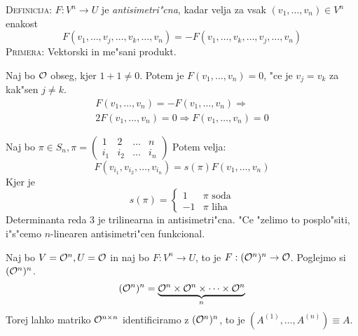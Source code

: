 %
\textsc{Definicija:} $F: V^n \to U$ je \emph{antisimetri"cna}, kadar velja za vsak $(v_1, \ldots, v_n) \in V^n$ enakost
\begin{equation*}
F(v_1, \ldots, v_j, \ldots, v_k, \ldots, v_n) = - F(v_1, \ldots, v_k, \ldots, v_j, \ldots, v_n)
\end{equation*}
\textsc{Primera:} Vektorski in me"sani produkt.

Naj bo $\mathcal{O}$ obseg, kjer $1 + 1 \neq 0$. Potem je $F(v_1, \ldots, v_n) = 0$, "ce je $v_j = v_k$ za kak"sen $j \neq k$.
\begin{gather*}
F(v_1, \ldots, v_n) = - F(v_1, \ldots, v_n) \Rightarrow \\
2F(v_1, \ldots, v_n) = 0 \Rightarrow F(v_1, \ldots, v_n) = 0
\end{gather*}

Naj bo $\pi \in S_n, \pi = \begin{pmatrix}
1 & 2 & \ldots & n \\
i_1 & i_2 & \ldots & i_n
\end{pmatrix}$ Potem velja:
\begin{equation*}
F(v_{i_1}, v_{i_2}, \ldots, v_{i_n}) = s(\pi) F(v_1, \ldots, v_n)
\end{equation*}
Kjer je
\begin{equation*}
s(\pi) = \begin{cases}
1 & \text{$\pi$ soda}\\
-1 & \text{$\pi$ liha}
\end{cases}
\end{equation*}
%
Determinanta reda 3 je trilinearna in antisimetri"cna. "Ce "zelimo to posplo"siti, i"s"cemo $n$-linearen antisimetri"cen funkcional. 

Naj bo $V = \mathcal{O}^n, U = \mathcal{O}$ in naj bo $F: V^n \to U$, to je $F: (\mathcal{O}^n)^n \to \mathcal{O}$. Poglejmo si $(\mathcal{O}^n)^n$.
\begin{equation*}
(\mathcal{O}^n)^n = \underbrace{\mathcal{O}^n \times \mathcal{O}^n \times \cdots \times \mathcal{O}^n}_n
\end{equation*}
Torej lahko matriko $\mathcal{O}^{n \times n}$ identificiramo z $(\mathcal{O}^n)^n$, to je $(A^{(1)}, \ldots, A^{(n)}) \equiv A$.
 
